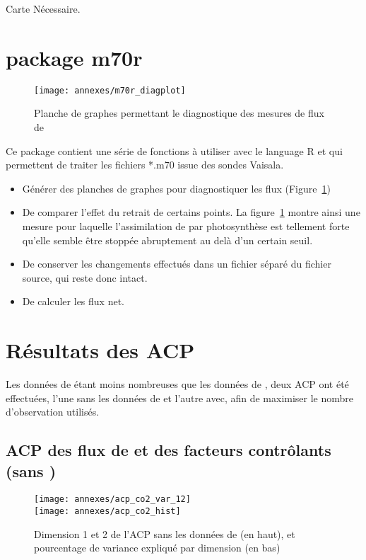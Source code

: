 Carte Nécessaire.

\section{package m70r}
\label{sec:pckg_m70r}

\begin{figure}
\centering
\texttt{[image: annexes/m70r\_diagplot]}
\caption{Planche de graphes permettant le diagnostique des mesures de flux de \coo}
\label{fig:m70r_diagplot}
\end{figure}

Ce package contient une série de fonctions à utiliser avec le language R et qui permettent de traiter les fichiers *.m70 issue des sondes Vaisala.

\begin{itemize}
\item Générer des planches de graphes pour diagnostiquer les flux (Figure~\ref{fig:m70r_diagplot})
\item De comparer l'effet du retrait de certains points. La figure~\ref{fig:m70r_diagplot} montre ainsi une mesure pour laquelle l'assimilation de \coo par photosynthèse est tellement forte qu'elle semble être stoppée abruptement au delà d'un certain seuil.
\item De conserver les changements effectués dans un fichier séparé du fichier source, qui reste donc intact.
\item De calculer les flux net.
\end{itemize}

\clearpage
\section{Résultats des ACP}
\label{sec:acp}

Les données de \chh étant moins nombreuses que les données de \coo, deux ACP ont été effectuées, l'une sans les données de \chh et l'autre avec, afin de maximiser le nombre d'observation utilisés.

\subsection{ACP des flux de \coo et des facteurs contrôlants (sans \chh)}

\begin{figure}[!hbt]
\centering
\texttt{[image: annexes/acp\_co2\_var\_12]}\\
\texttt{[image: annexes/acp\_co2\_hist]}
\caption{Dimension 1 et 2 de l'ACP sans les données de \chh (en haut), et pourcentage de variance expliqué par dimension (en bas)}
\label{fig:acp_co2}
\end{figure}


